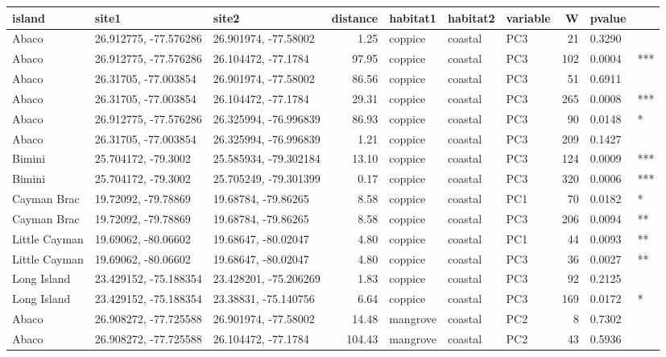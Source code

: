 
\begin{tabular}{l|l|l|r|l|l|l|r|l|l}
\hline
island & site1 & site2 & distance & habitat1 & habitat2 & variable & W & pvalue & \\
\hline
Abaco & 26.912775, -77.576286 & 26.901974, -77.58002 & 1.25 & coppice & coastal & PC3 & 21 & 0.3290 & \\
\hline
Abaco & 26.912775, -77.576286 & 26.104472, -77.1784 & 97.95 & coppice & coastal & PC3 & 102 & 0.0004 & ***\\
\hline
Abaco & 26.31705, -77.003854 & 26.901974, -77.58002 & 86.56 & coppice & coastal & PC3 & 51 & 0.6911 & \\
\hline
Abaco & 26.31705, -77.003854 & 26.104472, -77.1784 & 29.31 & coppice & coastal & PC3 & 265 & 0.0008 & ***\\
\hline
Abaco & 26.912775, -77.576286 & 26.325994, -76.996839 & 86.93 & coppice & coastal & PC3 & 90 & 0.0148 & *\\
\hline
Abaco & 26.31705, -77.003854 & 26.325994, -76.996839 & 1.21 & coppice & coastal & PC3 & 209 & 0.1427 & \\
\hline
Bimini & 25.704172, -79.3002 & 25.585934, -79.302184 & 13.10 & coppice & coastal & PC3 & 124 & 0.0009 & ***\\
\hline
Bimini & 25.704172, -79.3002 & 25.705249, -79.301399 & 0.17 & coppice & coastal & PC3 & 320 & 0.0006 & ***\\
\hline
Cayman Brac & 19.72092, -79.78869 & 19.68784, -79.86265 & 8.58 & coppice & coastal & PC1 & 70 & 0.0182 & *\\
\hline
Cayman Brac & 19.72092, -79.78869 & 19.68784, -79.86265 & 8.58 & coppice & coastal & PC3 & 206 & 0.0094 & **\\
\hline
Little Cayman & 19.69062, -80.06602 & 19.68647, -80.02047 & 4.80 & coppice & coastal & PC1 & 44 & 0.0093 & **\\
\hline
Little Cayman & 19.69062, -80.06602 & 19.68647, -80.02047 & 4.80 & coppice & coastal & PC3 & 36 & 0.0027 & **\\
\hline
Long Island & 23.429152, -75.188354 & 23.428201, -75.206269 & 1.83 & coppice & coastal & PC3 & 92 & 0.2125 & \\
\hline
Long Island & 23.429152, -75.188354 & 23.38831, -75.140756 & 6.64 & coppice & coastal & PC3 & 169 & 0.0172 & *\\
\hline
Abaco & 26.908272, -77.725588 & 26.901974, -77.58002 & 14.48 & mangrove & coastal & PC2 & 8 & 0.7302 & \\
\hline
Abaco & 26.908272, -77.725588 & 26.104472, -77.1784 & 104.43 & mangrove & coastal & PC2 & 43 & 0.5936 & \\

\end{tabular}
